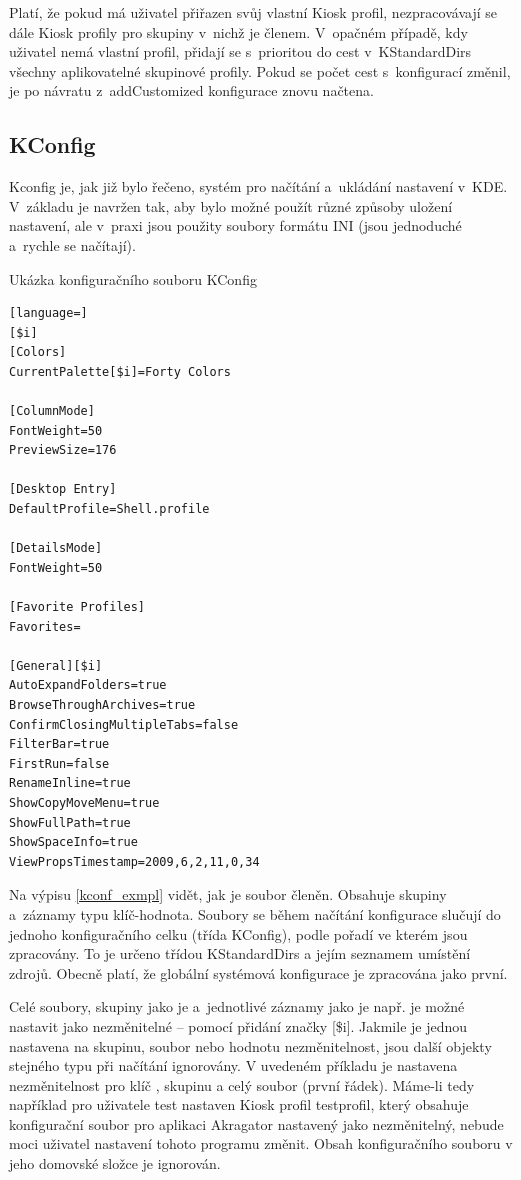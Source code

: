 Platí, že pokud má uživatel přiřazen svůj vlastní Kiosk profil, nezpracovávají se dále Kiosk profily pro skupiny v~nichž je členem. V~opačném případě, kdy uživatel nemá vlastní profil, přidají se s~prioritou do cest v~KStandardDirs všechny aplikovatelné skupinové profily. Pokud se počet cest s~konfigurací změnil, je po návratu z~addCustomized konfigurace znovu načtena.

\subsection{KConfig}
Kconfig je, jak již bylo řečeno, systém pro načítání a~ukládání nastavení v~KDE. V~základu je navržen tak, aby bylo možné použít různé způsoby uložení nastavení, ale v~praxi jsou použity soubory formátu INI (jsou jednoduché a~rychle se načítají).
\begin{mylisting}
\caption{Ukázka konfiguračního souboru KConfig}
\label{kconf_exmpl}
\begin{lstlisting}[language=]
[$i]
[Colors]
CurrentPalette[$i]=Forty Colors

[ColumnMode]
FontWeight=50
PreviewSize=176

[Desktop Entry]
DefaultProfile=Shell.profile

[DetailsMode]
FontWeight=50

[Favorite Profiles]
Favorites=

[General][$i]
AutoExpandFolders=true
BrowseThroughArchives=true
ConfirmClosingMultipleTabs=false
FilterBar=true
FirstRun=false
RenameInline=true
ShowCopyMoveMenu=true
ShowFullPath=true
ShowSpaceInfo=true
ViewPropsTimestamp=2009,6,2,11,0,34
\end{lstlisting}
\end{mylisting}

Na výpisu \ref{kconf_exmpl} vidět, jak je soubor členěn. Obsahuje skupiny a~záznamy typu klíč-hodnota. Soubory se během načítání konfigurace slučují do jednoho konfiguračního celku (třída KConfig), podle pořadí ve kterém jsou zpracovány. To je určeno třídou KStandardDirs a jejím seznamem umístění zdrojů. Obecně platí, že globální systémová konfigurace je zpracována jako první.

Celé soubory, skupiny jako je  a~jednotlivé záznamy jako je např.  je možné nastavit jako nezměnitelné --  pomocí přidání značky [\$i]. Jakmile je jednou nastavena na skupinu, soubor nebo hodnotu nezměnitelnost, jsou další objekty stejného typu při načítání ignorovány. V uvedeném příkladu je nastavena nezměnitelnost pro klíč , skupinu  a celý soubor (první řádek). Máme-li tedy například pro uživatele test nastaven Kiosk profil testprofil, který obsahuje konfigurační soubor pro aplikaci Akragator nastavený jako nezměnitelný, nebude moci uživatel nastavení tohoto programu změnit. Obsah konfiguračního souboru v jeho domovské složce je ignorován.

